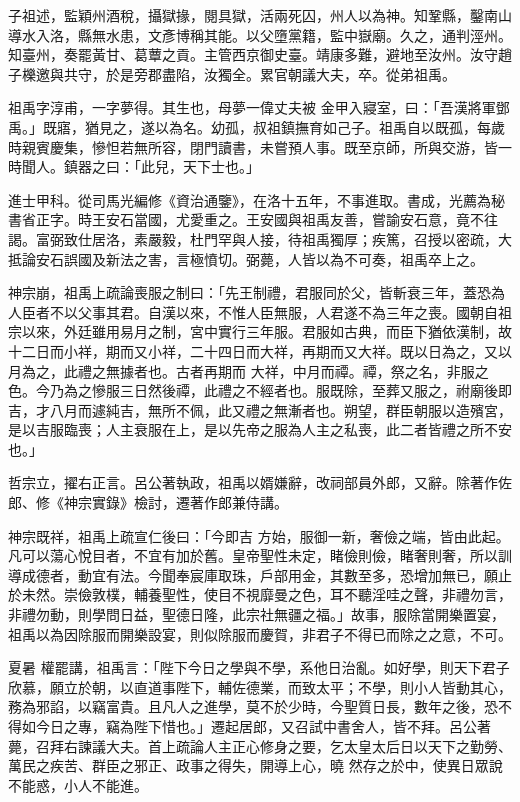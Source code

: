 \begin{pinyinscope}
 子祖述，監穎州酒稅，攝獄掾，閱具獄，活兩死囚，州人以為神。知鞏縣，鑿南山導水入洛，縣無水患，文彥博稱其能。以父墮黨籍，監中嶽廟。久之，通判涇州。知臺州，奏罷黃甘、葛蕈之貢。主管西京御史臺。靖康多難，避地至汝州。汝守趙子櫟邀與共守，於是旁郡盡陷，汝獨全。累官朝議大夫，卒。從弟祖禹。



 祖禹字淳甫，一字夢得。其生也，母夢一偉丈夫被
 金甲入寢室，曰：「吾漢將軍鄧禹。」既寤，猶見之，遂以為名。幼孤，叔祖鎮撫育如己子。祖禹自以既孤，每歲時親賓慶集，慘怛若無所容，閉門讀書，未嘗預人事。既至京師，所與交游，皆一時聞人。鎮器之曰：「此兒，天下士也。」



 進士甲科。從司馬光編修《資治通鑒》，在洛十五年，不事進取。書成，光薦為秘書省正字。時王安石當國，尤愛重之。王安國與祖禹友善，嘗諭安石意，竟不往謁。富弼致仕居洛，素嚴毅，杜門罕與人接，待祖禹獨厚；疾篤，召授以密疏，大
 抵論安石誤國及新法之害，言極憤切。弼薨，人皆以為不可奏，祖禹卒上之。



 神宗崩，祖禹上疏論喪服之制曰：「先王制禮，君服同於父，皆斬衰三年，蓋恐為人臣者不以父事其君。自漢以來，不惟人臣無服，人君遂不為三年之喪。國朝自祖宗以來，外廷雖用易月之制，宮中實行三年服。君服如古典，而臣下猶依漢制，故十二日而小祥，期而又小祥，二十四日而大祥，再期而又大祥。既以日為之，又以月為之，此禮之無據者也。古者再期而
 大祥，中月而禫。禫，祭之名，非服之色。今乃為之慘服三日然後禫，此禮之不經者也。服既除，至葬又服之，祔廟後即吉，才八月而遽純吉，無所不佩，此又禮之無漸者也。朔望，群臣朝服以造殯宮，是以吉服臨喪；人主衰服在上，是以先帝之服為人主之私喪，此二者皆禮之所不安也。」



 哲宗立，擢右正言。呂公著執政，祖禹以婿嫌辭，改祠部員外郎，又辭。除著作佐郎、修《神宗實錄》檢討，遷著作郎兼侍講。



 神宗既祥，祖禹上疏宣仁後曰：「今即吉
 方始，服御一新，奢儉之端，皆由此起。凡可以蕩心悅目者，不宜有加於舊。皇帝聖性未定，睹儉則儉，睹奢則奢，所以訓導成德者，動宜有法。今聞奉宸庫取珠，戶部用金，其數至多，恐增加無已，願止於未然。崇儉敦樸，輔養聖性，使目不視靡曼之色，耳不聽淫哇之聲，非禮勿言，非禮勿動，則學問日益，聖德日隆，此宗社無疆之福。」故事，服除當開樂置宴，祖禹以為因除服而開樂設宴，則似除服而慶賀，非君子不得已而除之之意，不可。



 夏暑
 權罷講，祖禹言：「陛下今日之學與不學，系他日治亂。如好學，則天下君子欣慕，願立於朝，以直道事陛下，輔佐德業，而致太平；不學，則小人皆動其心，務為邪諂，以竊富貴。且凡人之進學，莫不於少時，今聖質日長，數年之後，恐不得如今日之專，竊為陛下惜也。」遷起居郎，又召試中書舍人，皆不拜。呂公著薨，召拜右諫議大夫。首上疏論人主正心修身之要，乞太皇太后日以天下之勤勞、萬民之疾苦、群臣之邪正、政事之得失，開導上心，曉
 然存之於中，使異日眾說不能惑，小人不能進。




\end{pinyinscope}
